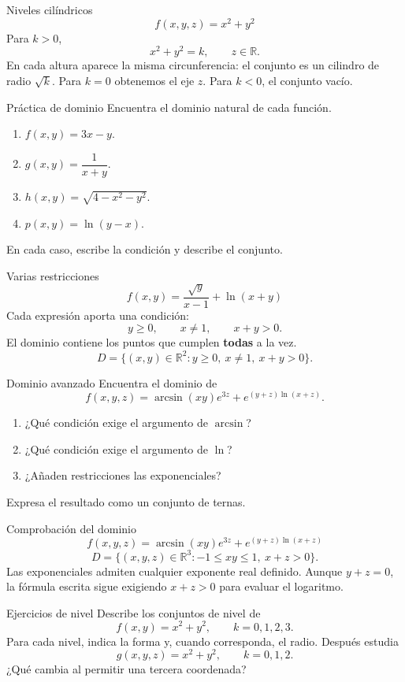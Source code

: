 \begin{frame}{Niveles cilíndricos}
\[f(x,y,z)=x^2+y^2\]
Para $k>0$,
\[x^2+y^2=k,\qquad z\in\mathbb R.\]
En cada altura aparece la misma circunferencia: el conjunto es un cilindro de radio $\sqrt k$.
\medskip
Para $k=0$ obtenemos el eje $z$. Para $k<0$, el conjunto vacío.
\end{frame}
\begin{frame}{Práctica de dominio}
Encuentra el dominio natural de cada función.
\begin{enumerate}
\item $f(x,y)=3x-y$.
\item $g(x,y)=\dfrac1{x+y}$.
\item $h(x,y)=\sqrt{4-x^2-y^2}$.
\item $p(x,y)=\ln(y-x)$.
\end{enumerate}
En cada caso, escribe la condición y describe el conjunto.
\end{frame}
\begin{frame}{Varias restricciones}
\[f(x,y)=\frac{\sqrt y}{x-1}+\ln(x+y)\]
Cada expresión aporta una condición:
\[y\ge0,\qquad x\ne1,\qquad x+y>0.\]
El dominio contiene los puntos que cumplen \textbf{todas} a la vez.
\[D=\{(x,y)\in\mathbb R^2:y\ge0,\ x\ne1,\ x+y>0\}.\]
\end{frame}
\begin{frame}{Dominio avanzado}
Encuentra el dominio de
\[f(x,y,z)=\arcsin(xy)e^{3z}+e^{(y+z)\ln(x+z)}.\]
\begin{enumerate}
\item ¿Qué condición exige el argumento de $\arcsin$?
\item ¿Qué condición exige el argumento de $\ln$?
\item ¿Añaden restricciones las exponenciales?
\end{enumerate}
Expresa el resultado como un conjunto de ternas.
\end{frame}
\begin{frame}{Comprobación del dominio}
\[f(x,y,z)=\arcsin(xy)e^{3z}+e^{(y+z)\ln(x+z)}\]
\[\boxed{D=\{(x,y,z)\in\mathbb R^3:-1\le xy\le1,\ x+z>0\}.}\]
Las exponenciales admiten cualquier exponente real definido.
\medskip
Aunque $y+z=0$, la fórmula escrita sigue exigiendo $x+z>0$ para evaluar el logaritmo.
\end{frame}
\begin{frame}{Ejercicios de nivel}
Describe los conjuntos de nivel de
\[f(x,y)=x^2+y^2,\qquad k=0,1,2,3.\]
Para cada nivel, indica la forma y, cuando corresponda, el radio.
\medskip
Después estudia
\[g(x,y,z)=x^2+y^2,\qquad k=0,1,2.\]
¿Qué cambia al permitir una tercera coordenada?
\end{frame}
